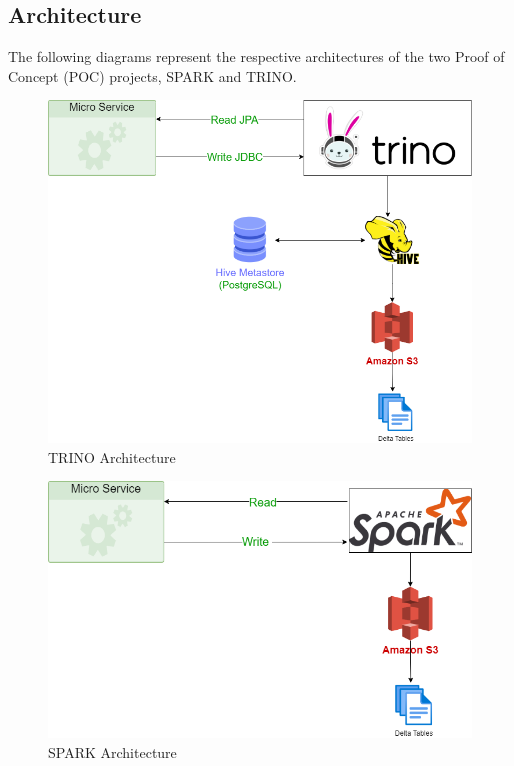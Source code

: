 \subsection{Architecture}
The following diagrams represent the respective architectures of the two Proof of Concept (POC) projects, SPARK and TRINO.

\begin{figure}[H]
\centering
\includegraphics[width=\linewidth]{images/trino_microservice.png}
\caption{TRINO Architecture}\label{fig:arch-trino}
\end{figure}

\begin{figure}[H]
\centering
\includegraphics[width=\linewidth]{images/archi-spark.png}
\caption{SPARK Architecture}\label{fig:arch-spark}
\end{figure}

